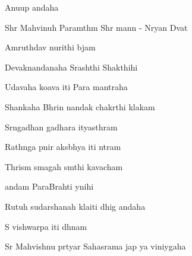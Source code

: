 \documentclass[20pt]{article}
\begin{document}
\SlokaHuge
{Anu{\sh}{\T}up {\ch}andaha}

\SlokaHuge
{Shr{\ee} Mah{\A}vi{\sh}nuh Param{\A}thm{\A}}
{Shr{\ee} mann - N{\A}r{\A}yan{\oh} D{\e}vat{\ha}}

\SlokaHuge
{Amruth{\am}{\sh}{\oo}d{\bh}av{\oh} nurithi  b{\ee}jam}

\SlokaHuge
{Devak{\ee}nandanaha Srash{\te}thi Shakthihi}

\SlokaHuge
{Ud{\bh}avaha k\y{\sh}{---}o{\bh}a}{{\de}va iti Para{\mo} mantraha}

\SlokaHuge
{Shankaha \dsh Bhrin nandak{\ee} chakr{\ee}thi k{\ee}lakam}

\SlokaHuge
{S{\ha}rngadhan{\va} ga{\da}dhara ityasthram}

\SlokaHuge
{Rath{\A}nga p{\A}nir aks{\ho}bhya iti n{\e}tram}

\SlokaHuge
{Thris{\A}m{\A} s{\A}magah s{\A}m{\e}thi kavacham}

\SlokaHuge
{{\An}andam ParaBrah{\me}ti y{\oh}nihi}

\SlokaHuge
{Rutuh sudarshanah k{\aaa}la}{iti dhig \dsh {\Bh}andaha}

\SlokaHuge
{S{\ri} vishwar{\oo}pa iti dh{\ya}nam}

\SlokaHuge
{Sr{\ee} Mah{\A}vishnu pr{\ee}tyar{\Th}{\e}}
{Sahasra{\na}ma jap{\e} {\Pa}{\ra}ya{\nE} viniy{\oh}gaha}

\newpage




\end{document}
